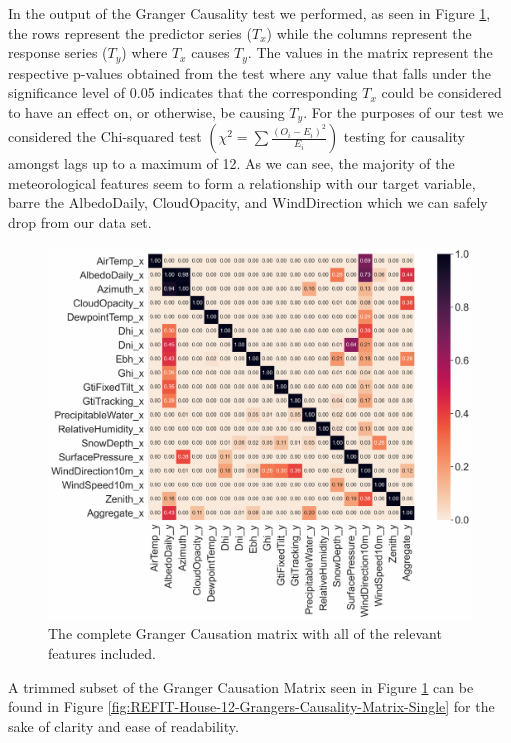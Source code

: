 \noindent In the output of the Granger Causality test we performed, as seen in Figure \ref{fig:REFIT-House-12-Grangers-Causality-Matrix-All}, the rows represent the predictor series ($T_x$) while the columns represent the response series ($T_y$) where $T_x$ causes $T_y$. The values in the matrix represent the respective p-values obtained from the test where any value that falls under the significance level of 0.05 indicates that the corresponding $T_x$ could be considered to have an effect on, or otherwise, be causing $T_y$. For the purposes of our test we considered the Chi-squared test $\left(\chi^2 = \sum \frac{(O_i - E_i)^2}{E_i}\right)$ testing for causality amongst lags up to a maximum of 12. As we can see, the majority of the meteorological features seem to form a relationship with our target variable, barre the AlbedoDaily, CloudOpacity,  and WindDirection which we can safely drop from our data set.

\begin{figure}[H]
    \centering
    \includegraphics[width=\textwidth]{Images/Chapter 5/REFIT/REFIT-House-12-Grangers-Causality-Matrix.pdf}
    \caption{The complete Granger Causation matrix with all of the relevant features included.}
    \label{fig:REFIT-House-12-Grangers-Causality-Matrix-All}
\end{figure}

\noindent A trimmed subset of the Granger Causation Matrix seen in Figure \ref{fig:REFIT-House-12-Grangers-Causality-Matrix-All} can be found in Figure \ref{fig:REFIT-House-12-Grangers-Causality-Matrix-Single} for the sake of clarity and ease of readability.


